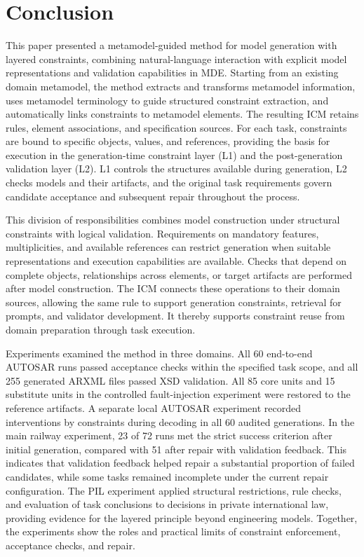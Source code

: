 \documentclass[pdflatex,iicol,sn-mathphys-num]{sn-jnl}
\begin{document}
\section{Conclusion}\label{sec:conclusion}

This paper presented a metamodel-guided method for model generation with layered constraints, combining natural-language interaction with explicit model representations and validation capabilities in MDE. Starting from an existing domain metamodel, the method extracts and transforms metamodel information, uses metamodel terminology to guide structured constraint extraction, and automatically links constraints to metamodel elements. The resulting ICM retains rules, element associations, and specification sources. For each task, constraints are bound to specific objects, values, and references, providing the basis for execution in the generation-time constraint layer (L1) and the post-generation validation layer (L2). L1 controls the structures available during generation, L2 checks models and their artifacts, and the original task requirements govern candidate acceptance and subsequent repair throughout the process.

This division of responsibilities combines model construction under structural constraints with logical validation. Requirements on mandatory features, multiplicities, and available references can restrict generation when suitable representations and execution capabilities are available. Checks that depend on complete objects, relationships across elements, or target artifacts are performed after model construction. The ICM connects these operations to their domain sources, allowing the same rule to support generation constraints, retrieval for prompts, and validator development. It thereby supports constraint reuse from domain preparation through task execution.

Experiments examined the method in three domains. All 60 end-to-end AUTOSAR runs passed acceptance checks within the specified task scope, and all 255 generated ARXML files passed XSD validation. All 85 core units and 15 substitute units in the controlled fault-injection experiment were restored to the reference artifacts. A separate local AUTOSAR experiment recorded interventions by constraints during decoding in all 60 audited generations. In the main railway experiment, 23 of 72 runs met the strict success criterion after initial generation, compared with 51 after repair with validation feedback. This indicates that validation feedback helped repair a substantial proportion of failed candidates, while some tasks remained incomplete under the current repair configuration. The PIL experiment applied structural restrictions, rule checks, and evaluation of task conclusions to decisions in private international law, providing evidence for the layered principle beyond engineering models. Together, the experiments show the roles and practical limits of constraint enforcement, acceptance checks, and repair.
\end{document}
